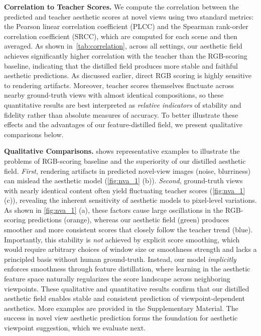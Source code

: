 \noindent\textbf{Correlation to Teacher Scores.} We compute the correlation between the predicted and teacher aesthetic scores at novel views using two standard metrics: the Pearson linear correlation coefficient (PLCC) and the Spearman rank-order correlation coefficient (SRCC), which are computed for each scene and then averaged. 
As shown in~\cref{tab:correlation}, across all settings, our aesthetic field achieves significantly higher correlation with the teacher than the RGB-scoring baseline, indicating that the distilled field produces more stable and faithful aesthetic predictions. 
As discussed earlier, direct RGB scoring is highly sensitive to rendering artifacts.  
Moreover, teacher scores themselves fluctuate across nearby ground-truth views with almost identical compositions, so these quantitative results are best interpreted as \textit{relative indicators} of stability and fidelity rather than absolute measures of accuracy.
To better illustrate these effects and the advantages of our feature-distilled field, we present qualitative comparisons below.

\noindent\textbf{Qualitative Comparisons.}  shows representative examples to illustrate the problems of RGB-scoring baseline and the superiority of our distilled aesthetic field.  
\textit{First}, rendering artifacts in predicted novel-view images (\eg noise, blurriness) can mislead the aesthetic model (\cref{fig:nva_1} (b)).
\textit{Second}, ground-truth views with nearly identical content often yield fluctuating teacher scores (\cref{fig:nva_1} (c)), revealing the inherent sensitivity of aesthetic models to pixel-level variations.
As shown in \cref{fig:nva_1} (a), these factors cause large oscillations in the RGB-scoring predictions (orange), whereas our aesthetic field (green) produces smoother and more consistent scores that closely follow the teacher trend (blue). Importantly, this stability is \textit{not} achieved by explicit score smoothing, which would require arbitrary choices of window size or smoothness strength and lacks a principled basis without human ground-truth. Instead, our model \textit{implicitly} enforces smoothness through feature distillation, where learning in the aesthetic feature space naturally regularizes the score landscape across neighboring viewpoints.
These qualitative and quantitative results confirm that our distilled aesthetic field enables stable and consistent prediction of viewpoint-dependent aesthetics. More examples are provided in the Supplementary Material.
The success in novel view aesthetic prediction forms the foundation for aesthetic viewpoint suggestion, which we evaluate next.

